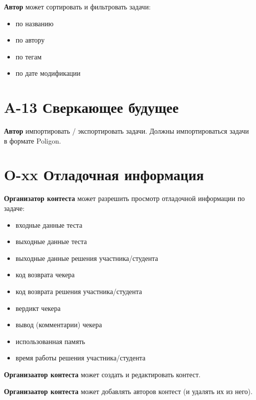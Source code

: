 \documentclass{book}
\begin{document}
\textbf{Автор} может сортировать и фильтровать задачи:
\begin{itemize}\setlength{\itemsep}{0pt}
	\item по названию
	\item по автору
	\item по тегам
	\item по дате модификации 
\end{itemize}

\newpage \section*{A-13 Сверкающее будущее}
\textbf{Автор} импортировать / экспортировать задачи. Должны импортироваться задачи в 
формате Poligon.



\newpage \section*{O-xx Отладочная информация}
\textbf{Организатор контеста} может разрешить просмотр отладочной информации по задаче:
\begin{itemize}\setlength{\itemsep}{0pt}
	\item входные данные теста
	\item выходные данные теста
	\item выходные данные решения участника/студента
	\item код возврата чекера
	\item код возврата решения участника/студента
	\item вердикт чекера
	\item вывод (комментарии) чекера
	\item использованная память
	\item время работы решения участника/студента
\end{itemize}

\textbf{Организаатор контеста} может создать и редактировать контест.

\textbf{Организаатор контеста} может добавлять авторов контест (и удалять их из него).
\end{document}
